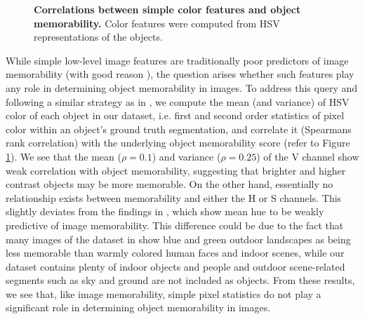 \begin{figure}[!htb]
\centering
{}
\vspace{-5mm}\caption{\footnotesize\textbf{Correlations between simple color features and object memorability.} Color features were computed from HSV representations of the objects. }\label{fig:simple}
\end{figure}

While simple low-level image features are traditionally poor predictors of image memorability \cite{isola11} (with good reason \cite{konkle10}), the question arises whether such features play any role in determining object memorability in images. To address this query and following a similar strategy as in , we compute the mean (and variance) of HSV color of each object in our dataset, i.e. first and second order  statistics of pixel color within an object's ground truth segmentation, and correlate it (Spearmans rank correlation) with the underlying object memorability score (refer to Figure \ref{fig:simple}). We see that the mean ($\rho = 0.1$) and variance ($\rho=0.25$) of the V channel show weak correlation with object memorability, suggesting that brighter and higher contrast objects may be more memorable. On the other hand, essentially no relationship exists between memorability and either the H or S channels. This slightly deviates from the findings in \cite{isola11}, which show mean hue to be weakly predictive of image memorability. This difference could be due to the fact that many images of the dataset in \cite{isola11} show blue and green outdoor landscapes as being less memorable than warmly colored human faces and indoor scenes, while our dataset contains plenty of indoor objects and people and outdoor scene-related segments such as sky and ground are not included as objects. From these results, we see that, like image memorability, simple pixel statistics do not play a significant role in determining object memorability in images.

